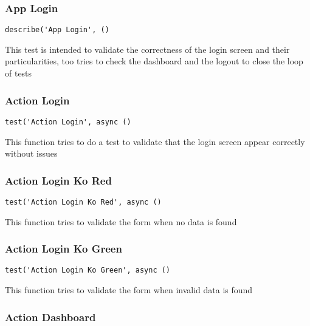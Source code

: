 \documentclass[a4paper]{article}
\begin{document}
\hypertarget{toc26}{}
\subsubsection{App Login}

\begin{lstlisting}
describe('App Login', ()
\end{lstlisting}

This test is intended to validate the correctness of the login screen and their
particularities, too tries to check the dashboard and the logout to close the
loop of tests

\hypertarget{toc27}{}
\subsubsection{Action Login}

\begin{lstlisting}
test('Action Login', async ()
\end{lstlisting}

This function tries to do a test to validate that the login screen appear
correctly without issues

\hypertarget{toc28}{}
\subsubsection{Action Login Ko Red}

\begin{lstlisting}
test('Action Login Ko Red', async ()
\end{lstlisting}

This function tries to validate the form when no data is found

\hypertarget{toc29}{}
\subsubsection{Action Login Ko Green}

\begin{lstlisting}
test('Action Login Ko Green', async ()
\end{lstlisting}

This function tries to validate the form when invalid data is found

\hypertarget{toc30}{}
\subsubsection{Action Dashboard}
\end{document}
